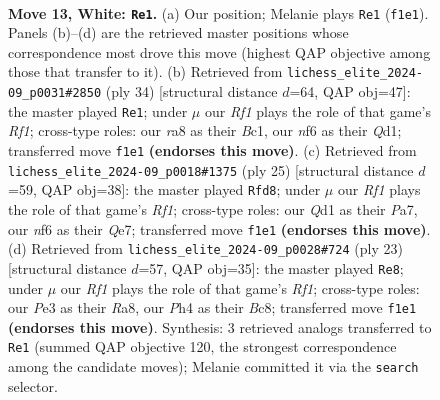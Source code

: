 \documentclass[11pt]{article}
\begin{document}
\clearpage

\begin{figure}[p]\centering
\begin{subfigure}{0.46\textwidth}\centering
\resizebox{\linewidth}{!}{%
\newchessgame
\chessboard[
  setfen={rr4k1/pppbqppp/2n1pn2/8/2BP3P/4PNP1/PP1B1P2/R2Q1RK1 w - - 3 13},
  showmover=false,
  pgfstyle=straightmove, color=movearrow, markmove={f1-e1}
]}
\caption{}
\end{subfigure}\hfill
\begin{subfigure}{0.46\textwidth}\centering
\resizebox{\linewidth}{!}{%
\newchessgame
\chessboard[
  setfen={r2n1rk1/1ppqp1bp/4pnp1/1P1p4/3P4/1R3B1P/2P1NPP1/2BQ1RK1 w - - 0 18},
  showmover=false,
  pgfstyle=straightmove, color=movearrow, markmove={f1-e1}
]}
\caption{}
\end{subfigure}
\\[4pt]
\begin{subfigure}{0.46\textwidth}\centering
\resizebox{\linewidth}{!}{%
\newchessgame
\chessboard[
  setfen={r4rk1/ppp1qpb1/2n1b1pp/4p3/4N3/3P1NP1/PPPQ1PBP/R3R1K1 b - - 5 13},
  showmover=false,
  pgfstyle=straightmove, color=movearrow, markmove={f8-d8}
]}
\caption{}
\end{subfigure}\hfill
\begin{subfigure}{0.46\textwidth}\centering
\resizebox{\linewidth}{!}{%
\newchessgame
\chessboard[
  setfen={r1bq1rk1/p3bppp/p1p2n2/3p4/3P1B2/P1N5/1PP1NPPP/R2Q1RK1 b - - 1 12},
  showmover=false,
  pgfstyle=straightmove, color=movearrow, markmove={f8-e8}
]}
\caption{}
\end{subfigure}
\caption{\textbf{Move 13, White: \texttt{Re1}.} (a) Our position; Melanie plays \texttt{Re1} (\texttt{f1e1}). Panels (b)--(d) are the retrieved master positions whose correspondence most drove this move (highest QAP objective among those that transfer to it). (b) Retrieved from \texttt{lichess\_elite\_2024-09\_p0031\#2850} (ply 34) [structural distance $d$=64, QAP obj=47]: the master played \texttt{Re1}; under $\mu$ our \emph{Rf1} plays the role of that game's \emph{Rf1}; cross-type roles: our \emph{r}a8 as their \emph{B}c1, our \emph{n}f6 as their \emph{Q}d1; transferred move \texttt{f1e1} \textbf{(endorses this move)}. (c) Retrieved from \texttt{lichess\_elite\_2024-09\_p0018\#1375} (ply 25) [structural distance $d$=59, QAP obj=38]: the master played \texttt{Rfd8}; under $\mu$ our \emph{Rf1} plays the role of that game's \emph{Rf1}; cross-type roles: our \emph{Q}d1 as their \emph{P}a7, our \emph{n}f6 as their \emph{Q}e7; transferred move \texttt{f1e1} \textbf{(endorses this move)}. (d) Retrieved from \texttt{lichess\_elite\_2024-09\_p0028\#724} (ply 23) [structural distance $d$=57, QAP obj=35]: the master played \texttt{Re8}; under $\mu$ our \emph{Rf1} plays the role of that game's \emph{Rf1}; cross-type roles: our \emph{P}e3 as their \emph{R}a8, our \emph{P}h4 as their \emph{B}c8; transferred move \texttt{f1e1} \textbf{(endorses this move)}. Synthesis: 3 retrieved analogs transferred to \texttt{Re1} (summed QAP objective 120, the strongest correspondence among the candidate moves); Melanie committed it via the \texttt{search} selector.}
\label{fig:thought-m24}
\end{figure}
\end{document}
